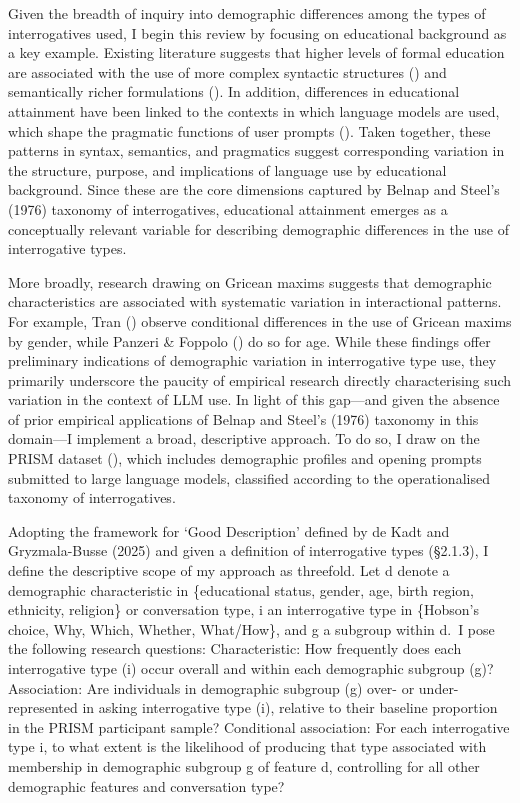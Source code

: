 \documentclass[
  12pt,
]{article}
\begin{document}
Given the breadth of inquiry into demographic differences among the types of interrogatives used, I begin this review by focusing on educational background as a key example. Existing literature suggests that higher levels of formal education are associated with the use of more complex syntactic structures () and semantically richer formulations (). In addition, differences in educational attainment have been linked to the contexts in which language models are used, which shape the pragmatic functions of user prompts (). Taken together, these patterns in syntax, semantics, and pragmatics suggest corresponding variation in the structure, purpose, and implications of language use by educational background. Since these are the core dimensions captured by Belnap and Steel's (1976) taxonomy of interrogatives, educational attainment emerges as a conceptually relevant variable for describing demographic differences in the use of interrogative types.

More broadly, research drawing on Gricean maxims suggests that demographic characteristics are associated with systematic variation in interactional patterns. For example, Tran () observe conditional differences in the use of Gricean maxims by gender, while Panzeri \& Foppolo () do so for age. While these findings offer preliminary indications of demographic variation in interrogative type use, they primarily underscore the paucity of empirical research directly characterising such variation in the context of LLM use. In light of this gap---and given the absence of prior empirical applications of Belnap and Steel's (1976) taxonomy in this domain---I implement a broad, descriptive approach. To do so, I draw on the PRISM dataset (), which includes demographic profiles and opening prompts submitted to large language models, classified according to the operationalised taxonomy of interrogatives.

Adopting the framework for `Good Description' defined by de Kadt and Gryzmala-Busse (2025) and given a definition of interrogative types (§2.1.3), I define the descriptive scope of my approach as threefold. Let d denote a demographic characteristic in \{educational status, gender, age, birth region, ethnicity, religion\} or conversation type, i an interrogative type in \{Hobson's choice, Why, Which, Whether, What/How\}, and g a subgroup within d.~I pose the following research questions:
Characteristic: How frequently does each interrogative type (i) occur overall and within each demographic subgroup (g)?
Association: Are individuals in demographic subgroup (g) over- or under-represented in asking interrogative type (i), relative to their baseline proportion in the PRISM participant sample?
Conditional association: For each interrogative type i, to what extent is the likelihood of producing that type associated with membership in demographic subgroup g of feature d, controlling for all other demographic features and conversation type?
\end{document}
